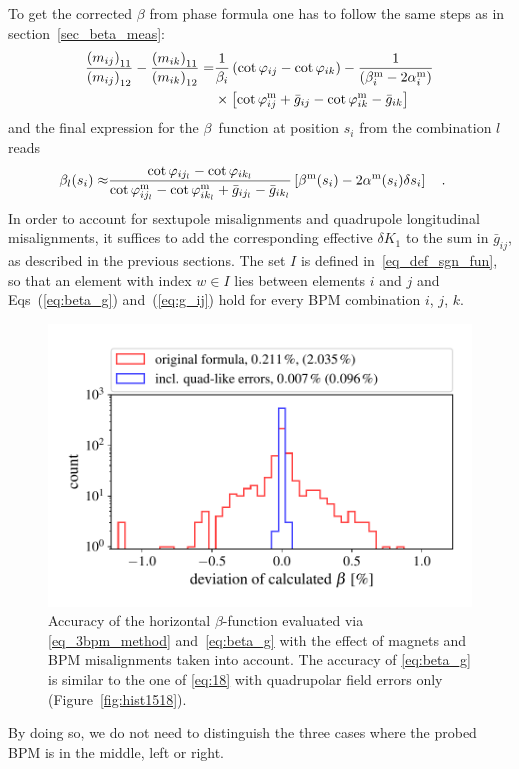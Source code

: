 %
To get the corrected $\beta$ from phase formula one has to follow the same steps as in section~\ref{sec_beta_meas}:
%
\begin{align}
    \frac{\left(m_{ij}\right)_{11}}{\left(m_{ij}\right)_{12}} - \frac{\left(m_{ik}\right)_{11}}{\left(m_{ik}\right)_{12}}
    =&
    \frac{1}{\beta_i} \left( \cot\varphi_{ij} - \cot\varphi_{ik}\right)
    -
    \frac{1}{\left(\beta_i^\text{m} - 2\alpha_i^\text{m} \right) } 
    \notag \\
    &\times\left[
        \cot\varphi_{ij}^\text{m}  + \bar{g}_{ij}
        -
        \cot\varphi_{ik}^\text{m}  - \bar{g}_{ik}
    \right]
\end{align}
%
and the final expression for the $\beta$~function at position $s_i$ from the combination $l$ reads
%
\begin{align}
\beta_l(s_i) \approx& \frac{\cot\varphi_{i{j_l}} - \cot\varphi_{i{k_l}}}{\cot\varphi_{i{j_l}}^\text{m} - \cot\varphi_{i{k_l}}^\text{m} +\bar{g}_{i{j_l}} - \bar{g}_{i{k_l}}} \left[\beta^\text{m}(s_i) - 2 \alpha^\text{m}(s_i) \delta s_i\right]
    \quad .
\label{eq:beta_g}
\end{align}
%
In order to account for sextupole misalignments and quadrupole longitudinal misalignments, it suffices
to add the corresponding effective $\delta K_1$ to the sum in $\bar{g}_{ij}$,
as described in the previous sections. 
The set $I$ is defined in~\eqref{eq_def_sgn_fun},
so that an element with index $ w \in I$ lies between elements $ i $ and $ j $
and Eqs~(\ref{eq:beta_g}) and~(\ref{eq:g_ij}) hold for every BPM combination $ i $, $ j $, $ k $.
%
\begin{figure}
	\centering
  \includegraphics[width=.7\linewidth]{hist1518_EVERYTHING_01}
    \caption{Accuracy of the horizontal $\beta$-function evaluated via \eqref{eq_3bpm_method} and~\eqref{eq:beta_g} with the effect of magnets and BPM misalignments taken into account. The accuracy of
 \eqref{eq:beta_g} is similar to the one of \eqref{eq:18} with quadrupolar field errors only (Figure~\ref{fig:hist1518}).}
	\label{fig:hist1518_with_everything}
\end{figure}
%
By doing so, we do not need to distinguish the three cases where the probed BPM is in the middle, left or right.

